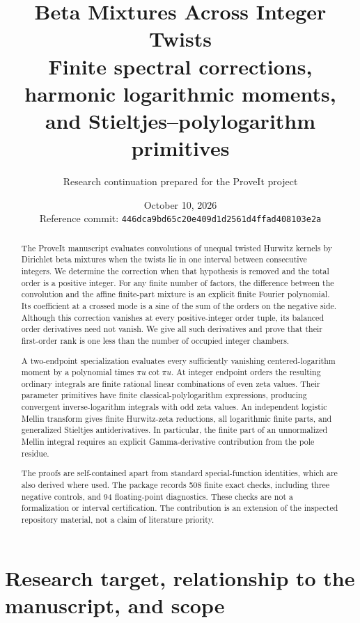 \documentclass[11pt,letterpaper]{article}
\title{\textbf{Beta Mixtures Across Integer Twists}\\[5pt]
\large Finite spectral corrections, harmonic logarithmic moments,\\
and Stieltjes--polylogarithm primitives}
\author{Research continuation prepared for the ProveIt project}
\date{October 10, 2026\\[3pt]\small Reference commit: \texttt{446dca9bd65c20e409d1d2561d4ffad408103e2a}}
\numberwithin{equation}{section}
\theoremstyle{definition}
\theoremstyle{remark}
\begin{document}
\maketitle
\begin{abstract}
The ProveIt manuscript evaluates convolutions of unequal twisted Hurwitz
kernels by Dirichlet beta mixtures when the twists lie in one interval
between consecutive integers. We determine the correction when that
hypothesis is removed and the total order is a positive integer. For any
finite number of factors, the difference between the convolution and the
affine finite-part mixture is an explicit finite Fourier polynomial. Its
coefficient at a crossed mode is a sine of the sum of the orders on the
negative side. Although this correction vanishes at every positive-integer
order tuple, its balanced order derivatives need not vanish. We give all
such derivatives and prove that their first-order rank is one less than
the number of occupied integer chambers.

A two-endpoint specialization evaluates every sufficiently vanishing
centered-logarithm moment by a polynomial times $\pi u\cot\pi u$. At integer
endpoint orders the resulting ordinary integrals are finite rational
linear combinations of even zeta values. Their parameter primitives have
finite classical-polylogarithm expressions, producing convergent
inverse-logarithm integrals with odd zeta values. An independent logistic
Mellin transform gives finite Hurwitz-zeta reductions, all logarithmic
finite parts, and generalized Stieltjes antiderivatives. In particular,
the finite part of an unnormalized Mellin integral requires an explicit
Gamma-derivative contribution from the pole residue.

The proofs are self-contained apart from standard special-function
identities, which are also derived where used. The package records 508
finite exact checks, including three negative controls, and 94
floating-point diagnostics. These checks are not a formalization or
interval certification. The contribution is an extension of the inspected
repository material, not a claim of literature priority.
\end{abstract}
\newpage
\begingroup
\setlength{\parskip}{0pt}
\tableofcontents
\endgroup
\newpage

\section{Research target, relationship to the manuscript, and scope}
\label{bc:sec:introduction}
\end{document}
